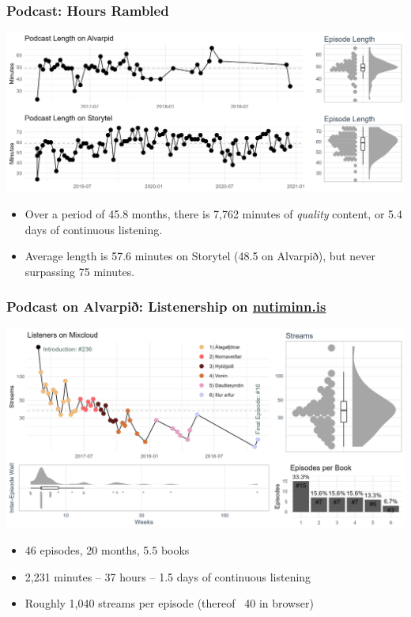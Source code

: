 \begin{frame}
    \frametitle{Podcast: Hours Rambled}
    \includegraphics[width=\textwidth]{../R/figures/iskisur_length}

    \begin{itemize}
        \item Over a period of 45.8 months, there is 7,762 minutes of \emph{quality} content, or 5.4 days of continuous
        listening.
        \item Average length is 57.6 minutes on Storytel (48.5 on Alvarpið), but never surpassing 75 minutes.
    \end{itemize}
\end{frame}

\begin{frame}
    \frametitle{Podcast on Alvarpið: Listenership on \url{nutiminn.is}}
    \includegraphics[width=\textwidth]{../R/figures/alvarpid_listeners.png}

    \begin{itemize}
        \item 46 episodes, 20 months, 5.5 books
        \item 2,231 minutes -- 37 hours -- 1.5 days of continuous listening
        \item Roughly 1,040 streams per episode (thereof ~40 in browser)
    \end{itemize}
\end{frame}

